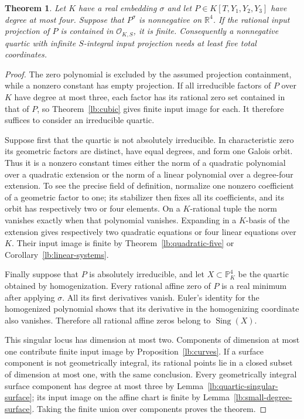 \documentclass[11pt,a4paper]{article}
\newtheorem{theorem}{Theorem}[section]
\theoremstyle{definition}
\newcommand{\OKS}{\mathcal O_{K,S}}
\newcommand{\PP}{\mathbb P}
\begin{document}
\begin{theorem}\label{lb:nonnegative-quartic-five}
Let $K$ have a real embedding $\sigma$ and let
$P\in K[T,Y_1,Y_2,Y_3]$ have degree at most four. Suppose that
$P^\sigma$ is nonnegative on $\mathbb R^4$. If the rational
input projection of $P$ is contained in $\OKS$, it is finite.
Consequently a nonnegative quartic with infinite $S$-integral
input projection needs at least five total coordinates.
\end{theorem}
\begin{proof}
The zero polynomial is excluded by the assumed projection
containment, while a nonzero constant has empty projection.
If all irreducible factors of $P$ over $K$ have degree at most
three, each factor has its rational zero set contained in that
of $P$, so Theorem~\ref{lb:cubic} gives finite input image for
each. It therefore suffices to consider an irreducible quartic.

Suppose first that the quartic is not absolutely irreducible.
In characteristic zero its geometric factors are distinct,
have equal degrees, and form one Galois orbit. Thus it is a
nonzero constant times either the norm of a quadratic polynomial
over a quadratic extension or the norm of a linear polynomial
over a degree-four extension. To see the precise field of
definition, normalize one nonzero coefficient of a geometric
factor to one; its stabilizer then fixes all its coefficients,
and its orbit has respectively two or four elements. On a
$K$-rational tuple the norm vanishes exactly when that polynomial
vanishes. Expanding in a $K$-basis of the extension gives
respectively two quadratic equations or four linear equations
over $K$. Their input image is finite by
Theorem~\ref{lb:quadratic-five} or
Corollary~\ref{lb:linear-systems}.

Finally suppose that $P$ is absolutely irreducible, and let
$X\subset\PP^4_K$ be the quartic obtained by homogenization.
Every rational affine zero of $P$ is a real minimum after
applying $\sigma$. All its first derivatives vanish. Euler's
identity for the homogenized polynomial shows that its derivative
in the homogenizing coordinate also vanishes. Therefore all
rational affine zeros belong to $\operatorname{Sing}(X)$.

This singular locus has dimension at most two. Components of
dimension at most one contribute finite input image by
Proposition~\ref{lb:curves}. If a surface component is not
geometrically integral, its rational points lie in a closed
subset of dimension at most one, with the same conclusion.
Every geometrically integral surface component has degree at
most three by Lemma~\ref{lb:quartic-singular-surface}; its
input image on the affine chart is finite by
Lemma~\ref{lb:small-degree-surface}. Taking the finite union
over components proves the theorem.
\end{proof}
\end{document}
